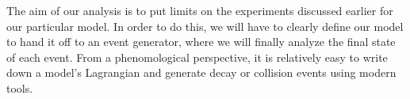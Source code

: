 \label{chapter:analysis}

The aim of our analysis is to put limits on the experiments discussed earlier for our particular model.
In order to do this, we will have to clearly define our model to hand it off to an event generator, where we will finally analyze the final state of each event.
From a phenomological perspective, it is relatively easy to write down a model's Lagrangian and generate decay or collision events using modern tools.


